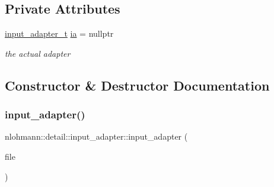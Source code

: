 \subsection*{Private Attributes}
\begin{DoxyCompactItemize}
\item 
\hyperlink{namespacenlohmann_1_1detail_ae132f8cd5bb24c5e9b40ad0eafedf1c2}{input\+\_\+adapter\+\_\+t} \hyperlink{classnlohmann_1_1detail_1_1input__adapter_ad5a11d0b65b68f6950cfbe8c8366b7da}{ia} = nullptr
\begin{DoxyCompactList}\small\item\em the actual adapter \end{DoxyCompactList}\end{DoxyCompactItemize}


\subsection{Constructor \& Destructor Documentation}
\mbox{\label{classnlohmann_1_1detail_1_1input__adapter_a19fb8c28f37b23099a4353acf0a9a2f1}} 
\subsubsection{\texorpdfstring{input\+\_\+adapter()}{input\_adapter()}\hspace{0.1cm}{\footnotesize\ttfamily [1/11]}}
{\footnotesize\ttfamily nlohmann\+::detail\+::input\+\_\+adapter\+::input\+\_\+adapter (\begin{DoxyParamCaption}\item[{std\+::\+F\+I\+LE $\ast$}]{file }\end{DoxyParamCaption})\hspace{0.3cm}{\ttfamily [inline]}}

\mbox{\label{classnlohmann_1_1detail_1_1input__adapter_ae89f11268d4724b3080473f7218abe86}} 

